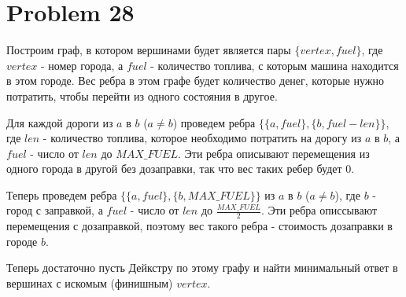 \documentclass[a4paper,12pt]{article}
\begin{document}
\section{Problem 28}

Построим граф, в котором вершинами будет является пары $\{vertex, fuel\}$, где $vertex$ - номер города, а $fuel$ - количество топлива, с которым машина находится в этом городе. Вес ребра в этом графе будет количество денег, которые нужно потратить, чтобы перейти из одного состояния в другое. 

Для каждой дороги из $a$ в $b$ ($a\ne b$) проведем ребра $\{\{a, fuel\}, \{b, fuel - len\}\}$, где $len$ - количество топлива, которое необходимо потратить на дорогу из $a$ в $b$, а $fuel$ - число от $len$ до $MAX\_FUEL$. Эти ребра описывают перемещения из одного города в другой без дозаправки, так что вес таких ребер будет $0$.

Теперь проведем ребра $\{\{a, fuel\}, \{b, MAX\_FUEL\}\}$ из $a$ в $b$ ($a\ne b$), где $b$ - город с заправкой, а $fuel$ - число от $len$ до $\frac{MAX\_FUEL}{2}$. Эти ребра описсывают перемещения с дозаправкой, поэтому вес такого ребра - стоимость дозаправки в городе $b$.

Теперь достаточно пусть Дейкстру по этому графу и найти минимальный ответ в вершинах с искомым (финишным) $vertex$.
\end{document}
